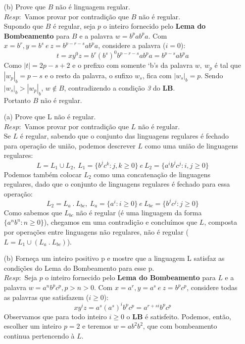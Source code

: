 \documentclass{homework}
\begin{document}
\pagebreak

	\begin{enumerate}
		\item[(b)] Prove que $B$ não é linguagem regular.\\
		$Resp:$ Vamos provar por contradição que $B$ não é regular.\\
			Supondo que $B$ é regular, seja $p$ o inteiro fornecido pelo \textbf{Lema do Bombeamento} para $B$ e a palavra $w = b^pab^pa$. Com $x = b^r, y = b^{s}\ e\ z = b^{p-r-s}ab^pa$, considere a palavra ($i = 0$):
			\[t = xy^0z = b^r(b^s)^0b^{p-r-s}ab^pa = b^{p-s}ab^pa\]
			Como $|t|=2p-s+2$ e o prefixo com somente `b's da palavra $w,\ w_p$ é tal que $|w_p|_b = p - s$ e o resto da palavra, o sufixo $w_s$, fica com $|w_s|_b = p$. Sendo $|w_s|_b > |w_p|_b$, $w \notin B$, contradizendo a condição \textit{3} do \textbf{LB}.\\
			Portanto $B$ não é regular.
	\end{enumerate}
	
\pagebreak	
	
	\begin{itemize}
		\item[(a)] Prove que L não é regular.\\
		$Resp:$ Vamos provar por contradição que $L$ não é regular.\\
			Se $L$ é regular, sabendo que o conjunto das linguagens regulares é fechado para operação de união, podemos descrever $L$ como uma união de linguagens regulares: 
			\[L = L_1 \cup L_2,\ L_1 = \{b^j c^k:j,k \geq 0\}\ e\ L_2 = \{a^i b^j c^j:i,j \geq 0\}\] 
			Podemos também colocar $L_2$ como uma concatenação de linguagens regulares, dado que o conjunto de linguagens regulares é fechado para essa operação:
			\[L_2 = L_a\ .\ L_{bc},\ L_a = \{a^i:i \geq 0\}\ e\ L_{bc} = \{b^j c^j:j \geq 0\}\]
			Como sabemos que $L_{bc}$ não é regular (é uma linguagem da forma $\{a^nb^n:n \geq 0\}$), chegamos em uma contradição e concluímos que $L$, composta por operações entre linguagens não regulares, não é regular ($L = L_1 \cup (L_a\ .\ L_{bc})$).
	\end{itemize}
	\begin{itemize}
		\item[(b)] Forneça um inteiro positivo p e mostre que a linguagem L satisfaz
as condições do Lema do Bombeamento para esse p.\\
		$Resp:$ Seja $p$ o inteiro fornecido pelo \textbf{Lema do Bombeamento} para $L$ e a palavra $w = a^nb^pc^p, p > n > 0$. Com $x = a^r, y = a^s\ e\ z = b^pc^p$, considere todas as palavras que satisfazem ($i \geq 0$):
			\[xy^iz = a^s(a^{s})^i b^pc^p = a^{r+si}b^pc^p\]
		Observamos que para todo inteiro $i \geq 0$ o \textbf{LB} é satisfeito. Podemos, então, escolher um inteiro $p = 2$ e teremos $w = ab^2b^2$, que com bombeamento continua pertencendo à $L$.
	\end{itemize}
\end{document}
